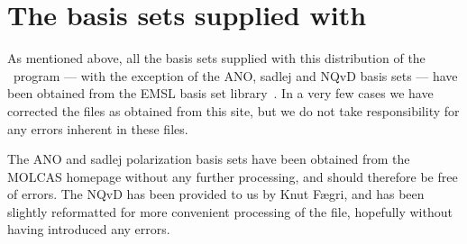 \section{The basis sets supplied with \dalton }

As mentioned above, all the basis sets supplied with this distribution
of the \dalton\ program --- with the exception of the ANO,
sadlej
and NQvD basis sets --- have been obtained from the EMSL basis set
library~\cite{emslref}. In a very few cases we have corrected the
files as obtained from this site, but we do not take responsibility
for any errors inherent in these files.

The ANO and sadlej polarization basis sets have been obtained from the
MOLCAS homepage without any further processing, and should therefore
be free of errors. The NQvD has been provided to us by Knut F\ae gri,
and has been slightly reformatted for more convenient processing of
the file, hopefully without having introduced any errors.



